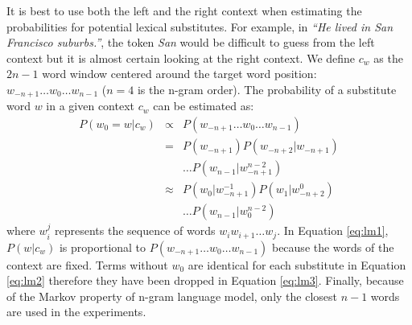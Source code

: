 

It is best to use both the left and the right context when estimating the
probabilities for potential lexical substitutes.  For example, in
\emph{``He lived in San Francisco suburbs.''}, the token \emph{San}
would be difficult to guess from the left context but it is almost
certain looking at the right context.  We define $c_w$ as the $2n-1$
word window centered around the target word position: $w_{-n+1} \ldots
w_0 \ldots w_{n-1}$ ($n=4$ is the n-gram order).  The probability of a
substitute word $w$ in a given context $c_w$ can be estimated as:
\begin{eqnarray}
  \label{eq:lm1}P(w_0 = w | c_w) & \propto & P(w_{-n+1}\ldots w_0\ldots w_{n-1})\\
  \label{eq:lm2}& = & P(w_{-n+1})P(w_{-n+2}|w_{-n+1})\nonumber\\
  &&\ldots P(w_{n-1}|w_{-n+1}^{n-2})\\
  \label{eq:lm3}& \approx & P(w_0| w_{-n+1}^{-1})P(w_{1}|w_{-n+2}^0)\nonumber\\
  &&\ldots P(w_{n-1}|w_0^{n-2})
\end{eqnarray}
where $w_i^j$ represents the sequence of words $w_i w_{i+1} \ldots
w_{j}$.  In Equation \ref{eq:lm1}, $P(w|c_w)$ is proportional to
$P(w_{-n+1}\ldots w_0 \ldots w_{n-1})$ because the words of the
context are fixed.  Terms without $w_0$ are identical for each
substitute in Equation \ref{eq:lm2} therefore they have been dropped
in Equation \ref{eq:lm3}.  Finally, because of the Markov property of
n-gram language model, only the closest $n-1$ words are used in the
experiments.

